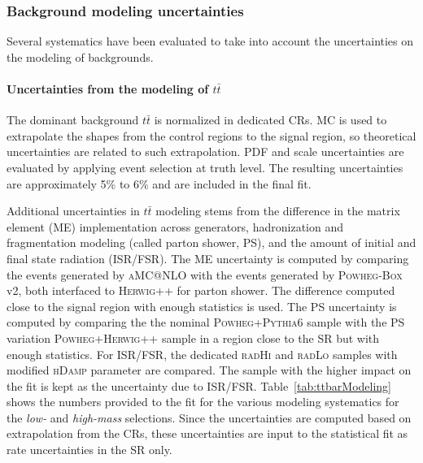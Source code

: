 \subsubsection{Background modeling uncertainties}
Several systematics have been evaluated to take into account the
uncertainties on the modeling of backgrounds. 

\paragraph{Uncertainties from the modeling of $t\bar{t}$}
\label{sec:topsys}
The dominant background $t\bar{t}$ is normalized in dedicated CRs. MC is used to extrapolate the shapes from the control regions to the signal region, so theoretical uncertainties are related to such extrapolation. PDF and scale uncertainties are evaluated by applying event selection at truth level. The resulting uncertainties are approximately 5\% to 6\% and are included in the final fit.  

Additional uncertainties in $t\bar{t}$ modeling stems from the difference in the matrix element (ME) implementation across generators, hadronization and fragmentation modeling (called parton shower, PS), and the amount of initial and final state radiation (ISR/FSR). The ME uncertainty is computed by comparing the events generated by \textsc{aMC@NLO} with the events generated by \textsc{Powheg-Box} v2, both interfaced to \textsc{Herwig++}  for parton shower. The difference computed close to the signal region with enough statistics is used. The PS uncertainty is computed by comparing the the nominal \textsc{Powheg+Pythia6} sample with the PS variation \textsc{Powheg+Herwig++} sample in a region close to the SR but with enough statistics. For ISR/FSR, the dedicated \textsc{radHi} and \textsc{radLo} samples with modified \textsc{hDamp} parameter are compared. The sample with the higher impact on the fit is kept as the uncertainty due to ISR/FSR. Table~\ref{tab:ttbarModeling} shows the numbers provided to the fit for the various \ttbar modeling systematics for the \emph{low-} and \emph{high-mass} selections. Since the uncertainties are computed based on extrapolation from the CRs, these uncertainties are input to the statistical fit as rate uncertainties in the SR only. 

